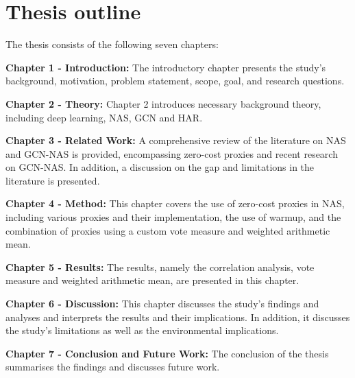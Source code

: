 \section{Thesis outline}

The thesis consists of the following seven chapters:

\textbf{Chapter 1 - Introduction:} The introductory chapter presents the study's background, motivation, problem statement, scope, goal, and research questions.

\textbf{Chapter 2 - Theory:} Chapter 2 introduces necessary background theory, including deep learning, \gls{NAS}, \gls{GCN} and \gls{HAR}.  

\textbf{Chapter 3 - Related Work:} A comprehensive review of the literature on \gls{NAS} and \gls{GCN}-\gls{NAS} is provided, encompassing zero-cost proxies and recent research on \gls{GCN}-\gls{NAS}. In addition, a discussion on the gap and limitations in the literature is presented. 

\textbf{Chapter 4 - Method:} This chapter covers the use of zero-cost proxies in \gls{NAS}, including various proxies and their implementation, the use of warmup, and the combination of proxies using a custom vote measure and weighted arithmetic mean. 

\textbf{Chapter 5 - Results:} The results, namely the correlation analysis, vote measure and weighted arithmetic mean, are presented in this chapter. 

\textbf{Chapter 6 - Discussion:} This chapter discusses the study's findings and analyses and interprets the results and their implications. In addition, it discusses the study's limitations as well as the environmental implications.

\textbf{Chapter 7 - Conclusion and Future Work:} The conclusion of the thesis summarises the findings and discusses future work. 